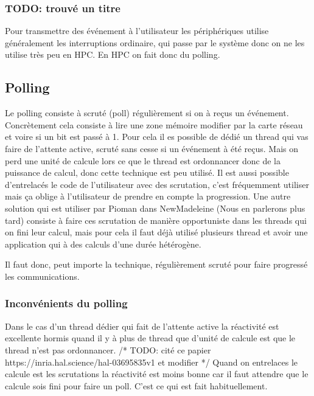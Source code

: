 \subsubsection{TODO: trouvé un titre}

Pour transmettre des événement à l'utilisateur les périphériques utilise généralement les interruptions ordinaire, qui passe par le système donc on ne les utilise très peu en HPC.
En HPC on fait donc du polling.

\subsection{Polling}

Le polling consiste à scruté (poll) régulièrement si on à reçus un événement.
Concrètement cela consiste à lire une zone mémoire modifier par la carte réseau et voire si un bit est passé à 1.
Pour cela il es possible de dédié un thread qui vas faire de l'attente active, scruté sans cesse si un événement à été reçus.
Mais on perd une unité de calcule lors ce que le thread est ordonnancer donc de la puissance de calcul, donc cette technique est peu utilisé. %
Il est aussi possible d'entrelacés le code de l'utilisateur avec des scrutation, c'est fréquemment utiliser mais ça oblige à l'utilisateur de prendre en compte la progression.
Une autre solution qui est utiliser par Pioman dans NewMadeleine (Nous en parlerons plus tard) consiste à faire ces scrutation de manière opportuniste dans les threads qui on fini leur calcul, mais pour cela il faut déjà utilisé plusieurs thread et avoir une application qui à des calculs d'une durée hétérogène.

Il faut donc, peut importe la technique, régulièrement scruté pour faire progressé les communications.

\subsubsection{Inconvénients du polling}


Dans le cas d'un thread dédier qui fait de l'attente active la réactivité est excellente hormis quand il y à plus de thread que d'unité de calcule est que le thread n'est pas ordonnancer.
/* TODO: cité ce papier https://inria.hal.science/hal-03695835v1 et modifier */
Quand on entrelaces le calcule est les scrutations la réactivité est moins bonne car il faut attendre que le calcule sois fini pour faire un poll.
C'est ce qui est fait habituellement.


